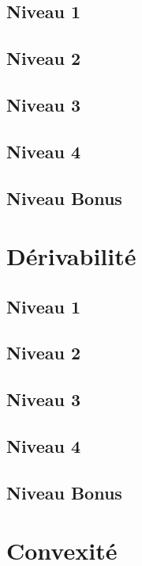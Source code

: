 \documentclass[a4paper]{report}
\begin{document}
			\subsection{Niveau 1}
		
			\subsection{Niveau 2}
		
			\subsection{Niveau 3}
			
			\subsection{Niveau 4}
			
			\subsection{Niveau Bonus}
		
		\section{Dérivabilité}
		
			\subsection{Niveau 1}
		
			\subsection{Niveau 2}
		
			\subsection{Niveau 3}
			
			\subsection{Niveau 4}
			
			\subsection{Niveau Bonus}
		
		\section{Convexité}
		
\end{document}
